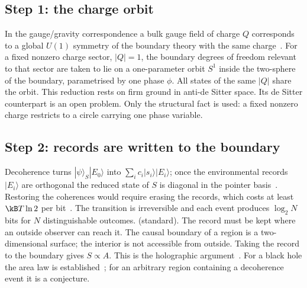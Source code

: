 \subsection{Step 1: the charge orbit}
In the gauge/gravity correspondence a bulk gauge field of charge $Q$ corresponds to a global $U(1)$ symmetry of the boundary theory with the same
charge~\cite{Maldacena1999}. For a fixed nonzero charge sector, $|Q|=1$, the boundary degrees of freedom relevant to that sector are taken to lie on
a one-parameter orbit $S^1$ inside the two-sphere of the boundary, parametrised by one phase $\phi$. All states of the same $|Q|$ share the orbit.
This reduction rests on firm ground in anti-de Sitter space. Its de Sitter counterpart is an open problem. \conjecture{} Only the structural fact
is used: a fixed nonzero charge restricts to a circle carrying one phase variable.

\subsection{Step 2: records are written to the boundary}
Decoherence turns $|\psi\rangle_S|E_0\rangle$ into $\sum_ic_i|s_i\rangle|E_i\rangle$; once the environmental records $|E_i\rangle$ are orthogonal the
reduced state of $S$ is diagonal in the pointer basis~\cite{Zurek2003}. Restoring the coherences would require erasing the records, which costs at
least $\kB T\ln2$ per bit~\cite{Landauer1961}. The transition is irreversible and each event produces $\log_2N$ bits for $N$ distinguishable
outcomes. \derived{} (standard). The record must be kept where an outside observer can reach it. The causal boundary of a region is a
two-dimensional surface; the interior is not accessible from outside. Taking the record to the boundary gives $S\propto A$. This is the holographic
argument~\cite{tHooft1993,Susskind1995}. For a black hole the area law is established~\cite{Bekenstein1973,Hawking1975}; for an arbitrary region
containing a decoherence event it is a conjecture. \conjecture

